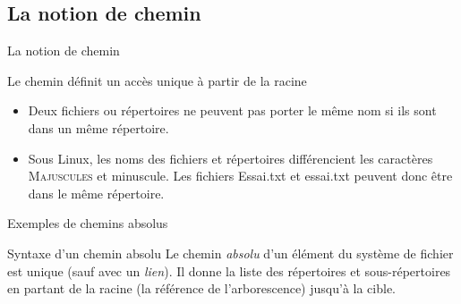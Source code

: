 \subsection{La notion de chemin}
\begin{frame}{La notion de chemin}
  \begin{block}{Le chemin définit un accès unique à partir de la racine}
    \begin{itemize}
    \item Deux fichiers ou répertoires ne peuvent pas porter le même nom
      si ils sont dans un même répertoire.
    \item Sous Linux, les noms des fichiers et répertoires différencient
      les caractères \textsc{Majuscules} et minuscule. Les fichiers
      \alert{E}ssai.txt et \alert{e}ssai.txt peuvent donc être dans le
      même répertoire.
    \end{itemize}
  \end{block}
  \begin{block}{Exemples de chemins absolus}
  \end{block}
  \begin{alertblock}{Syntaxe d'un chemin absolu}
    Le chemin \textit{absolu} d'un élément du système de fichier est
    unique (sauf avec un \emph{lien}). Il donne la liste des répertoires
    et sous-répertoires en partant de la racine \lin{/} (la référence de
    l'arborescence) jusqu'à la cible.
  \end{alertblock}
\end{frame}


